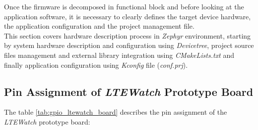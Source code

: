 \documentclass[report.tex]{subfiles}
\begin{document}
Once the firmware is decomposed in functional block and before looking at the application software, it is necessary to clearly defines the target device hardware, the application configuration and the project management file.\\

This section covers hardware description process in \textit{Zephyr} environment, starting by  system hardware description and configuration using \textit{Devicetree}, project source files management and external library integration using \textit{CMakeLists.txt} and finally application configuration using \textit{Kconfig} file (\textit{conf.prj}).


\subsection{Pin Assignment of \textit{LTEWatch} Prototype Board}
The table \ref{tab:gpio_ltewatch_board} describes the pin assignment of the \textit{LTEWatch} prototype board:
\end{document}
